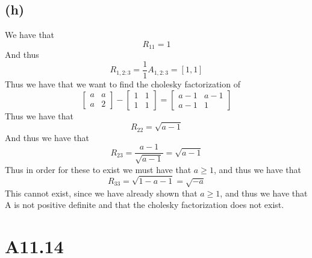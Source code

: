 \subsection*{(h)}
We have that 
$$R_11=1$$
And thus
$$R_{1,2:3}=\frac{1}{1}A_{1,2:3}=[1,1]$$
Thus we have that we want to find the cholesky factorization of
$$\begin{bmatrix}
    a & a\\
    a & 2
\end{bmatrix}-\begin{bmatrix}
    1 & 1\\
    1 & 1
\end{bmatrix}=\begin{bmatrix}
    a-1 & a-1\\
    a-1 & 1
\end{bmatrix}$$
Thus we have that
$$R_{22}=\sqrt{a-1}$$
And thus we have that
$$R_{23}=\frac{a-1}{\sqrt{a-1}}=\sqrt{a-1}$$
Thus in order for these to exist we must have that $a\geq 1$, and thus we have
that 
$$R_{33}=\sqrt{1-a-1}=\sqrt{-a}$$
This cannot exist, since we have already shown that $a\geq 1$, and thus we have
that A is not positive definite and that the cholesky factorization does not
exist.
\section*{A11.14}




